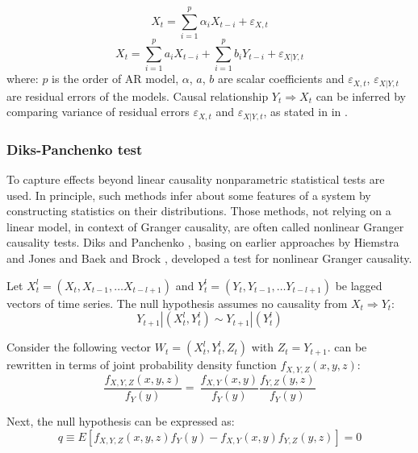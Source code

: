 \begin{equation}
X_t = \sum_{i=1}^{p} \alpha_i X_{t-i} + \varepsilon_{X,t}
\end{equation}
\begin{equation}
X_t = \sum_{i=1}^{p} a_i X_{t-i} + \sum_{i=1}^{p} b_i Y_{t-i} + \varepsilon_{X|Y,t}
\end{equation}
where: $p$ is the order of AR model, $\alpha$, $a$, $b$ are scalar coefficients and $\varepsilon_{X,t}$, $\varepsilon_{X|Y,t}$ are residual errors of the models.
Causal relationship $Y_t \Rightarrow X_t$ can be inferred by comparing variance of residual errors $\varepsilon_{X,t}$ and $\varepsilon_{X|Y,t}$, as stated in  in .

\subsubsection{Diks-Panchenko test}

To capture effects beyond linear causality nonparametric statistical tests are used.
In principle, such methods infer about some features of a system by constructing statistics on their distributions.
Those methods, not relying on a linear model, in context of Granger causality, are often called nonlinear Granger causality tests.
Diks and Panchenko \cite{diks-panchenko2004}, basing on earlier approaches by Hiemstra and Jones \cite{hiemstra-jones} and Baek and Brock \cite{baek-brock1992},
developed a test for nonlinear Granger causality.

Let $X_t^{l} = (X_t, X_{t-1}, \ldots X_{t-l+1})$ and $Y_t^{l} = (Y_t, Y_{t-1}, \ldots Y_{t-l+1})$
be lagged vectors of time series. The null hypothesis assumes no causality from $X_t \Rightarrow Y_t$:
\begin{equation} \label{eq:no-causality}
    Y_{t+1} | (X_t^{l}, Y_t^{l}) \sim Y_{t+1} | (Y_t^{l}) 
\end{equation}

Consider the following vector $W_t = (X_t^{l}, Y_t^{l}, Z_t)$ with $Z_t = Y_{t+1}$.  can be rewritten in terms of joint probability density function $f_{X,Y,Z}(x,y,z)$:
\begin{equation}
    \frac{f_{X,Y,Z}(x,y,z)}{f_Y(y)} = \
    \frac{f_{X,Y}(x,y)}{f_Y(y)} \frac{f_{Y,Z}(y,z)}{f_Y(y)}
\end{equation}

Next, the null hypothesis can be expressed as:
\begin{equation}
    q \equiv E [f_{X,Y,Z}(x,y,z) f_Y(y) - f_{X,Y}(x,y) f_{Y,Z}(y,z) ] = 0
\end{equation}

